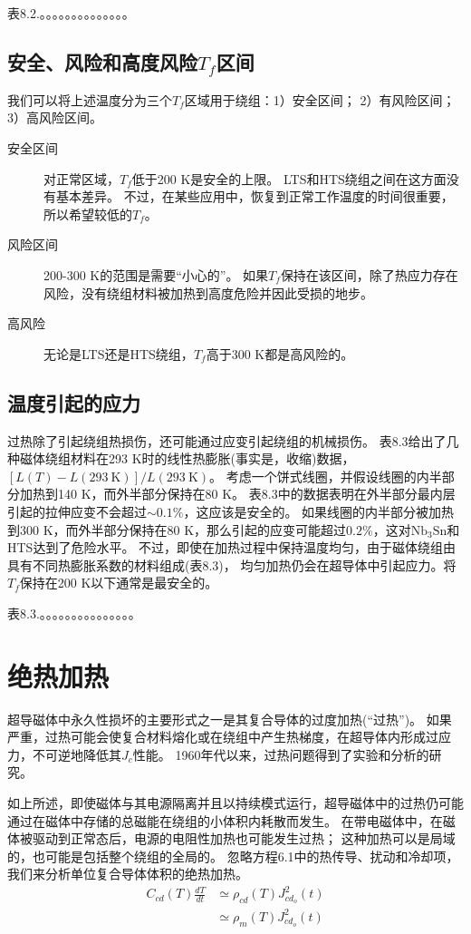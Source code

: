 表8.2.。。。。。。。。。。。。。。

\subsection{安全、风险和高度风险$T_f$区间}
我们可以将上述温度分为三个$T_f$区域用于绕组：1）安全区间； 2）有风险区间； 3）高风险区间。

\begin{description}
	\item[安全区间] 对正常区域，$T_f$低于200 K是安全的上限。
	LTS和HTS绕组之间在这方面没有基本差异。
	不过，在某些应用中，恢复到正常工作温度的时间很重要，所以希望较低的$T_f$。
	\item[风险区间] 200-300 K的范围是需要“小心的”。
	如果$T_f$保持在该区间，除了热应力存在风险，没有绕组材料被加热到高度危险并因此受损的地步。
	\item[高风险] 无论是LTS还是HTS绕组，$T_f$高于300 K都是高风险的。
\end{description}

\subsection{温度引起的应力}
过热除了引起绕组热损伤，还可能通过应变引起绕组的机械损伤。
表8.3给出了几种磁体绕组材料在293 K时的线性热膨胀(事实是，收缩)数据，$[L(T)-L(293\ \mathrm{K})]/L(293\ \mathrm{K})$。
考虑一个饼式线圈，并假设线圈的内半部分加热到140 K，而外半部分保持在80 K。
表8.3中的数据表明在外半部分最内层引起的拉伸应变不会超过$\sim 0.1\%$，这应该是安全的。
如果线圈的内半部分被加热到300 K，而外半部分保持在80 K，那么引起的应变可能超过$0.2\%$，这对$\mathrm{Nb_3Sn}$和HTS达到了危险水平。
不过，即使在加热过程中保持温度均匀，由于磁体绕组由具有不同热膨胀系数的材料组成(表8.3)，
均匀加热仍会在超导体中引起应力。将$T_f$保持在200 K以下通常是最安全的。

表8.3.。。。。。。。。。。。。。。。


\section{绝热加热}
超导磁体中永久性损坏的主要形式之一是其复合导体的过度加热(“过热”)。
如果严重，过热可能会使复合材料熔化或在绕组中产生热梯度，在超导体内形成过应力，不可逆地降低其$J_c$性能。
1960年代以来，过热问题得到了实验和分析的研究。

如上所述，即使磁体与其电源隔离并且以持续模式运行，超导磁体中的过热仍可能通过在磁体中存储的总磁能在绕组的小体积内耗散而发生。
在带电磁体中，在磁体被驱动到正常态后，电源的电阻性加热也可能发生过热；
这种加热可以是局域的，也可能是包括整个绕组的全局的。
忽略方程6.1中的热传导、扰动和冷却项，我们来分析单位复合导体体积的绝热加热。
\begin{subequations}
	\begin{align}
	C_{cd}(T)\frac{dT}{dt}&\simeq\rho_{cd}(T)J_{cd_o}^{2}(t) \\
	&\simeq\rho_m(T)J_{cd_o}^{2}(t)
	\end{align}
\end{subequations}

